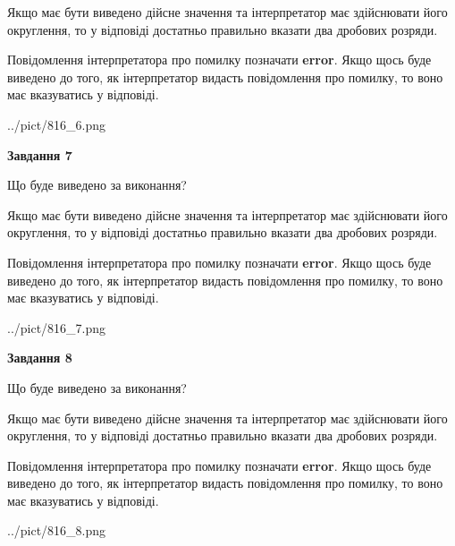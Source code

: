 \documentclass[12pt, ukrainian]{article}
\begin{document}
{\begin {Large}
Якщо має бути виведено дійсне значення та інтерпретатор має здійснювати його округлення, 
то у відповіді достатньо правильно вказати два дробових розряди.

Повідомлення інтерпретатора про помилку позначати \textbf{error}.
Якщо щось буде виведено до того, як інтерпретатор видасть повідомлення про помилку, 
то воно має вказуватись у відповіді. \par

\begin{center}
	{../pict/816_6.png}
\end{center}
\newpage

{\begin {center}\textbf{Завдання 7}\end {center}}\par
Що буде виведено за виконання? \par

Якщо має бути виведено дійсне значення та інтерпретатор має здійснювати його округлення, 
то у відповіді достатньо правильно вказати два дробових розряди.

Повідомлення інтерпретатора про помилку позначати \textbf{error}.
Якщо щось буде виведено до того, як інтерпретатор видасть повідомлення про помилку, 
то воно має вказуватись у відповіді. \par

\begin{center}
	{../pict/816_7.png}
\end{center}
\newpage

{\begin {center}\textbf{Завдання 8}\end {center}}\par
Що буде виведено за виконання? \par

Якщо має бути виведено дійсне значення та інтерпретатор має здійснювати його округлення, 
то у відповіді достатньо правильно вказати два дробових розряди.

Повідомлення інтерпретатора про помилку позначати \textbf{error}.
Якщо щось буде виведено до того, як інтерпретатор видасть повідомлення про помилку, 
то воно має вказуватись у відповіді. \par

\begin{center}
	{../pict/816_8.png}
\end{center}
\newpage


\end{Large}}
\end{document}
